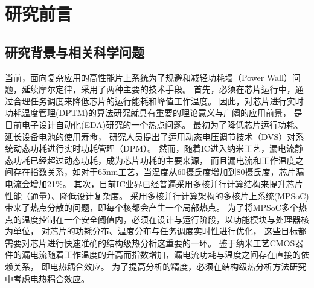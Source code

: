 


\chapter{研究前言}
\label{cha:intro}


\section{研究背景与相关科学问题}
当前，面向复杂应用的高性能片上系统为了规避和减轻功耗墙（Power Wall）问题，延续摩尔定律，采用了两种主要的技术手段。
首先，必须在芯片运行中，通过合理任务调度来降低芯片的运行能耗和峰值工作温度。 因此，对芯片进行实时功耗温度管理(DPTM)的算法研究就具有重要的理论意义与广阔的应用前景， 是目前电子设计自动化(EDA)研究的一个热点问题。
最初为了降低芯片运行功耗、延长设备电池的使用寿命， 研究人员提出了运用动态电压调节技术（DVS）对系统动态功耗进行实时功耗管理（DPM）。 然而，随着IC进入纳米工艺，漏电流静态功耗已经超过动态功耗，成为芯片功耗的主要来源， 而且漏电流和工作温度之间存在指数关系，如对于65nm工艺，当温度从60摄氏度增加到80摄氏度，芯片漏电流会增加21\%。
其次，目前IC业界已经普遍采用多核并行计算结构来提升芯片性能（通量）、降低设计复杂度。 采用多核并行计算架构的多核片上系统(MPSoC)带来了热点分散的问题，即每个核都会产生一个局部热点。 为了将MPSoC多个热点的温度控制在一个安全阈值内，必须在设计与运行阶段，以功能模块与处理器核为单位， 对芯片的功耗分布、温度分布与任务调度实时性进行优化， 这些目标都需要对芯片进行快速准确的结构级热分析这重要的一环。 鉴于纳米工艺CMOS器件的漏电流随着工作温度的升高而指数增加，漏电流功耗与温度之间存在直接的依赖关系， 即电热耦合效应。 为了提高分析的精度，必须在结构级热分析方法研究中考虑电热耦合效应。

